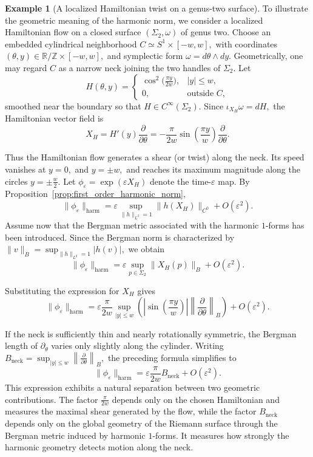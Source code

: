 \documentclass[11pt]{article}
\theoremstyle{definition}
\newtheorem{example}[theorem]{Example}
\begin{document}
	\begin{example}[A localized Hamiltonian twist on a genus-two surface]
		\label{ex:genus2_twist}
		To illustrate the geometric meaning of the harmonic norm, we consider a
		localized Hamiltonian flow on a closed surface $(\Sigma_2,\omega)$ of genus two.
		Choose an embedded cylindrical neighborhood $C\simeq S^1\times[-w,w],$ with
		coordinates $(\theta,y)\in\mathbb R/\mathbb Z\times[-w,w],$ and symplectic form
		$\omega=d\theta\wedge dy.$ Geometrically, one may regard $C$ as a narrow neck
		joining the two handles of $\Sigma_2$. Let
		\[
		H(\theta,y)=
		\begin{cases}
			\cos^2\!\bigl(\tfrac{\pi y}{2w}\bigr), & |y|\le w,\\[4pt]
			0, & \text{outside }C,
		\end{cases}
		\]
		smoothed near the boundary so that $H\in C^\infty(\Sigma_2)$. Since
		$\iota_{X_H}\omega=dH,$ the Hamiltonian vector field is
		\[
		X_H
		=
		H'(y)\frac{\partial}{\partial\theta}
		=
		-\frac{\pi}{2w}
		\sin\!\left(\frac{\pi y}{w}\right)
		\frac{\partial}{\partial\theta}.
		\]
		
		Thus the Hamiltonian flow generates a shear (or twist) along the neck. Its speed
		vanishes at $y=0,$ and $ y=\pm w,$ and reaches its maximum magnitude along the
		circles $y=\pm\frac{w}{2}.$ Let $\phi_\varepsilon = \exp(\varepsilon X_H)$
		denote the time-$\varepsilon$ map. By
		Proposition~\ref{prop:first_order_harmonic_norm},
		\[
		\|\phi_\varepsilon\|_{\mathrm{harm}}
		=
		\varepsilon
		\sup_{\|h\|_{L^2}=1}
		\|h(X_H)\|_{C^0}
		+
		O(\varepsilon^2).
		\]
		Assume now that the Bergman metric associated with the harmonic $1$-forms has
		been introduced. Since the Bergman norm is characterized by $\|v\|_B =
		\sup_{\|h\|_{L^2}=1} |h(v)|,$ we obtain
		\[
		\|\phi_\varepsilon\|_{\mathrm{harm}}
		=
		\varepsilon
		\sup_{p\in\Sigma_2}
		\|X_H(p)\|_B
		+
		O(\varepsilon^2).
		\]
		
		Substituting the expression for $X_H$ gives
		\[
		\|\phi_\varepsilon\|_{\mathrm{harm}}
		=
		\varepsilon
		\frac{\pi}{2w}
		\sup_{|y|\le w}
		\left(
		\left|
		\sin\!\left(\frac{\pi y}{w}\right)
		\right|
		\left\|
		\frac{\partial}{\partial\theta}
		\right\|_B
		\right)
		+
		O(\varepsilon^2).
		\]
		
		If the neck is sufficiently thin and nearly rotationally symmetric, the Bergman
		length of $\partial_\theta$ varies only slightly along the cylinder. Writing
		$B_{\mathrm{neck}} = \sup_{|y|\le w} \left\|\frac{\partial}{\partial\theta}
		\right\|_B,$ the preceding formula simplifies to 
		\[
		\|\phi_\varepsilon\|_{\mathrm{harm}} = \varepsilon \frac{\pi}{2w} B_{\mathrm{neck}}
		+ O(\varepsilon^2).
		\]
		This expression exhibits a natural separation between two geometric
		contributions. The factor $\frac{\pi}{2w}$ depends only on the chosen
		Hamiltonian and measures the maximal shear generated by the flow, while the
		factor $B_{\mathrm{neck}}$ depends only on the global geometry of the Riemann
		surface through the Bergman metric induced by harmonic $1$-forms. It measures
		how strongly the harmonic geometry detects motion along the neck.
		

\end{example}
\end{document}
